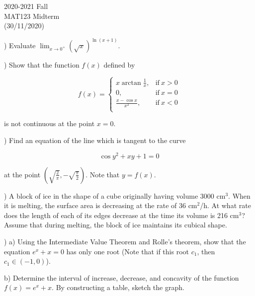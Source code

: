\documentclass{article}
\begin{document}
\pagestyle{empty}
\large

\begin{center}
2020-2021 Fall\\MAT123 Midterm\\(30/11/2020)
\end{center}

) Evaluate $\displaystyle\lim_{x\to0^+} (\sqrt x)^{\ln(x+1)}$.

\hfill

) Show that the function $f(x)$ defined by

\[
 f(x) =
\begin{cases}
\displaystyle x\arctan\frac{1}{x}, & \text{if}\ x > 0 \\
0, & \text{if}\ x = 0 \\
\displaystyle \frac{x-\cos x}{x^2}, & \text{if}\ x < 0 \\
\end{cases}
\]

\noindent is not continuous at the point $x=0$.

\hfill

) Find an equation of the line which is tangent to the curve

\begin{equation*}
\cos y^2 + xy + 1= 0
\end{equation*}

\noindent at the point $\displaystyle \left(\sqrt{\frac{2}{\pi}}, -\sqrt{\frac{\pi}{2}} \right)$. Note that $y=f(x)$.

\hfill

) A block of ice in the shape of a cube originally having volume 3000 cm$^3$. When it is melting, the surface area is decreasing at the rate of 36 cm$^2$/h. At what rate does the length of each of its edges decrease at the time its volume is 216 cm$^3$? Assume that during melting, the block of ice maintains its cubical shape.

\hfill

) a) Using the Intermediate Value Theorem and Rolle’s theorem, show that the equation $e^x + x = 0$ has only one root (Note that if this root $c_1$, then $c_1 \in (-1, 0)$).

\hfill

\noindent b) Determine the interval of increase, decrease, and concavity of the function $f(x) = e^x+x$. By constructing a table, sketch the graph.

\hfill
\end{document}
